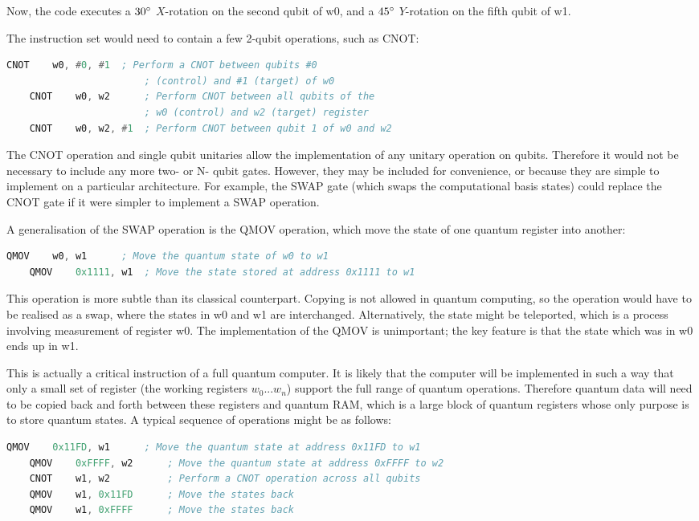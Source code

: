Now, the code executes a $30\degree$ $X$-rotation on the second qubit of w0, and a $45\degree$ $Y$-rotation on the fifth qubit of w1.

The instruction set would need to contain a few 2-qubit operations, such as CNOT:
\begin{lstlisting}[language=asm,caption={CNOT operations}]
    CNOT    w0, #0, #1  ; Perform a CNOT between qubits #0 
                        ; (control) and #1 (target) of w0
    CNOT    w0, w2      ; Perform CNOT between all qubits of the
                        ; w0 (control) and w2 (target) register 
    CNOT    w0, w2, #1  ; Perform CNOT between qubit 1 of w0 and w2 
\end{lstlisting}
The CNOT operation and single qubit unitaries allow the implementation of any unitary operation on qubits. Therefore it would not be necessary to include any more two- or N- qubit gates. However, they may be included for convenience, or because they are simple to implement on a particular architecture. For example, the SWAP gate (which swaps the computational basis states) could replace the CNOT gate if it were simpler to implement a SWAP operation. 

A generalisation of the SWAP operation is the QMOV operation, which move the state of one quantum register into another: 
\begin{lstlisting}[language=asm,caption={QMOV operations}]
    QMOV    w0, w1      ; Move the quantum state of w0 to w1
    QMOV    0x1111, w1  ; Move the state stored at address 0x1111 to w1
\end{lstlisting}
This operation is more subtle than its classical counterpart. Copying is not allowed in quantum computing, so the operation would have to be realised as a swap, where the states in w0 and w1 are interchanged. Alternatively, the state might be teleported, which is a process involving measurement of register w0. The implementation of the QMOV is unimportant; the key feature is that the state which was in w0 ends up in w1.

This is actually a critical instruction of a full quantum computer. It is likely that the computer will be implemented in such a way that only a small set of register (the working registers $w_0...w_n$) support the full range of quantum operations. Therefore quantum data will need to be copied back and forth between these registers and quantum RAM, which is a large block of quantum registers whose only purpose is to store quantum states. A typical sequence of operations might be as follows:
\begin{lstlisting}[language=asm,caption={Adding }]
    QMOV    0x11FD, w1      ; Move the quantum state at address 0x11FD to w1
    QMOV    0xFFFF, w2      ; Move the quantum state at address 0xFFFF to w2
    CNOT    w1, w2          ; Perform a CNOT operation across all qubits
    QMOV    w1, 0x11FD      ; Move the states back
    QMOV    w1, 0xFFFF      ; Move the states back
\end{lstlisting}

